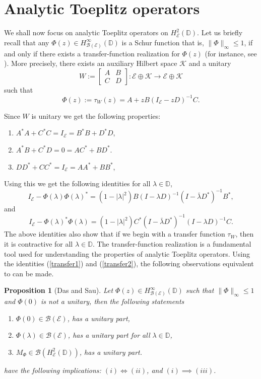 \documentclass[12pt]{amsart}
\numberwithin{equation}{section}
\newtheorem{propn}{Proposition}[section]
\theoremstyle{definition}
\newcommand{\D}{\mathbb{D}}
\newcommand{\1}{{\mbox{\bf 1}}}
\newcommand{\clb}{\mathcal{B}}
\newcommand{\cle}{\mathcal{E}}
\newcommand{\clk}{\mathcal{K}}
\newcommand{\raro}{\rightarrow}
\begin{document}
\section{Analytic Toeplitz operators}\label{analytic-toeplitz}
We shall now focus on analytic Toeplitz operators on $H_{\cle}^2(\D)$. Let us briefly recall that any $\Phi(z) \in H_{\clb(\cle)}^{\infty}(\D)$ is a Schur function that is, $\|\Phi\|_{\infty} \leq 1$, if and only if there exists a transfer-function realization for $\Phi(z)$ (for instance, see \cite[Theorem 1.1]{BBF}). More precisely, there exists an auxiliary Hilbert space $\clk$ and a unitary
\[
W := \begin{bmatrix}
A & B \\
C & D
\end{bmatrix}: \cle \oplus \clk \raro  \cle \oplus \clk
\]
such that 
\begin{equation}\label{transfer}
\Phi(z) := \tau_W(z) = A + z B (I_{\cle} - z D)^{-1} C.
\end{equation}

Since $W$ is unitary we get the following properties:
\begin{enumerate}
\item[(a)] $A^*A + C^*C = I_{\cle} = B^*B + D^*D$,
\item[(b)]$A^*B  + C^*D= 0 = AC^* +BD^*$.
\item[(c)] $D D^* + CC ^*= I_{\cle} = AA^* + BB^*$,
\end{enumerate}

Using this we get the following identities for all $\lambda \in \D$,
\begin{equation}\label{transfer1}
I_{\cle}  - \Phi(\lambda) \Phi(\lambda)^* = (1 - |\lambda|^2) B (I - \lambda D)^{-1} (I - \bar{\lambda} D^*)^{-1}  B^*,
\end{equation}
and
\begin{equation}\label{transfer2}
I_{\cle}  - \Phi(\lambda)^* \Phi(\lambda) = (1 - |\lambda|^2) C^* (I - \bar{\lambda} D^*)^{-1}  (I - \lambda D)^{-1}C.
\end{equation}
The above identities also show that if we begin with a transfer function $\tau_W$, then it is contractive for all $\lambda \in \D$. The transfer-function realization is a fundamental tool used for understanding the properties of analytic Toeplitz operators. Using the identities (\ref{transfer1}) and (\ref{transfer2}),  the following observations equivalent to \cite[Theorem 3.1]{DSau} can be made.
\begin{propn}[Das and Sau]\label{DS}
Let $\Phi(z) \in H_{\clb(\cle)}^{\infty}(\D)$ such that $\|\Phi\|_{\infty} \leq 1$ and $\Phi(0)$ is not a unitary,  then the following statements
\begin{enumerate}
\item[(i)] $\Phi(0) \in \clb(\cle)$, has a  unitary part,
\item[(ii)] $\Phi(\lambda) \in \clb(\cle)$, has a  unitary part for all $\lambda \in \D$,
\item[(iii)] $M_{\Phi} \in \clb(H_{\cle}^2(\D))$, has a unitary part.
\end{enumerate}
have the following implications: $(i) \Longleftrightarrow (ii)$, and $(i) \implies (iii)$.
\end{propn}
\end{document}
